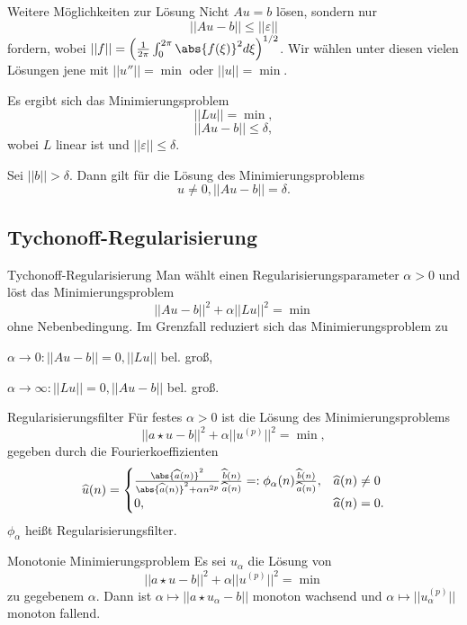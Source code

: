 \begin{karte}{Weitere Möglichkeiten zur Lösung}
    Nicht \(Au = b\) lösen, sondern nur 
    \[ ||Au - b|| \leq || \varepsilon|| \]
    fordern, wobei \( ||f|| = \left(\frac{1}{2\pi} \int_0^{2\pi} \abs{f(\xi)}^2 d\xi \right)^{1/2} \).
    Wir wählen unter diesen vielen Lösungen jene mit 
    \( ||u''|| = \min \) oder \(||u|| = \min\).

    Es ergibt sich das Minimierungsproblem 
    \[ ||Lu|| = \min, \]
    \[ ||Au - b|| \leq \delta, \]
    wobei \(L\) linear ist und \(||\varepsilon||\leq \delta\).
    
    Sei \(||b|| > \delta\). Dann gilt für die Lösung des Minimierungsproblems 
    \[ u \neq 0, ||Au - b || = \delta. \]
\end{karte}

\subsection{Tychonoff-Regularisierung}

\begin{karte}{Tychonoff-Regularisierung}
    Man wählt einen Regularisierungsparameter \(\alpha > 0\) und 
    löst das Minimierungsproblem 
    \[ ||Au - b||^2 + \alpha ||Lu||^2 = \min \]
    ohne Nebenbedingung. Im Grenzfall reduziert sich das Minimierungsproblem zu 
    
    \(\alpha \rightarrow 0: ||Au- b|| = 0, ||Lu||\) bel. groß,

    \(\alpha \rightarrow \infty: ||Lu|| = 0, ||Au-b||\) bel. groß.
\end{karte}

\begin{karte}{Regularisierungsfilter}
    Für festes \(\alpha > 0\) ist die Lösung des Minimierungsproblems 
    \[ ||a \star u - b||^2 + \alpha ||u^{(p)}||^2 = \min, \]
    gegeben durch die Fourierkoeffizienten 
    \[ \widehat{u}(n) = \begin{cases}
        \frac{\abs{\widehat{a}(n)}^2}{\abs{\widehat{a}(n)}^2 + \alpha n^{2p}} \frac{\widehat{b}(n)}{\widehat{a}(n)} 
        =: \phi_\alpha(n) \frac{\widehat{b}(n)}{\widehat{a}(n)}, & \widehat{a}(n) \neq 0 \\
        0, & \widehat{a}(n) = 0.
    \end{cases} \]
    \(\phi_\alpha\) heißt Regularisierungsfilter.
\end{karte}

\begin{karte}{Monotonie Minimierungsproblem}
    Es sei \(u_\alpha\) die Lösung von 
    \[ ||a \star u - b||^2 + \alpha ||u^{(p)}||^2 = \min \] 
    zu gegebenem \(\alpha\). Dann ist 
    \(\alpha \mapsto ||a \star u_\alpha - b|| \) monoton wachsend 
    und \(\alpha \mapsto ||u_\alpha^{(p)}||\) monoton fallend.
\end{karte}

